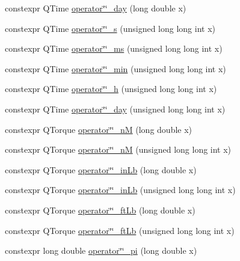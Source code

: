 \begin{DoxyCompactItemize}
\item 
constexpr Q\+Time \mbox{\hyperlink{namespaceokapi_1_1literals_a399e9f29b15b5e34ea3577f011a3ca28}{operator\char`\"{}\char`\"{}\+\_\+day}} (long double x)
\item 
constexpr Q\+Time \mbox{\hyperlink{namespaceokapi_1_1literals_a52e2803db21d89b8f608c32ad57a1d1d}{operator\char`\"{}\char`\"{}\+\_\+s}} (unsigned long long int x)
\item 
constexpr Q\+Time \mbox{\hyperlink{namespaceokapi_1_1literals_a3051bde71591186f767c4f1000044b5e}{operator\char`\"{}\char`\"{}\+\_\+ms}} (unsigned long long int x)
\item 
constexpr Q\+Time \mbox{\hyperlink{namespaceokapi_1_1literals_ae9718c12341692e929cde7bedcc55e4a}{operator\char`\"{}\char`\"{}\+\_\+min}} (unsigned long long int x)
\item 
constexpr Q\+Time \mbox{\hyperlink{namespaceokapi_1_1literals_a0d7788ca50c37d059b79a6d8363ea0f9}{operator\char`\"{}\char`\"{}\+\_\+h}} (unsigned long long int x)
\item 
constexpr Q\+Time \mbox{\hyperlink{namespaceokapi_1_1literals_a323a83894d9b82367a9a5e4ed103bb42}{operator\char`\"{}\char`\"{}\+\_\+day}} (unsigned long long int x)
\item 
constexpr Q\+Torque \mbox{\hyperlink{namespaceokapi_1_1literals_ac65b950fcec6f63f51fb8aa139cd43ec}{operator\char`\"{}\char`\"{}\+\_\+nM}} (long double x)
\item 
constexpr Q\+Torque \mbox{\hyperlink{namespaceokapi_1_1literals_a433bada2f177e78607acb15e2953668c}{operator\char`\"{}\char`\"{}\+\_\+nM}} (unsigned long long int x)
\item 
constexpr Q\+Torque \mbox{\hyperlink{namespaceokapi_1_1literals_aaa3c99e6571a76cd4088d2d55afd357d}{operator\char`\"{}\char`\"{}\+\_\+in\+Lb}} (long double x)
\item 
constexpr Q\+Torque \mbox{\hyperlink{namespaceokapi_1_1literals_a7bb3fd8e274b246c16fb5d7189e280dc}{operator\char`\"{}\char`\"{}\+\_\+in\+Lb}} (unsigned long long int x)
\item 
constexpr Q\+Torque \mbox{\hyperlink{namespaceokapi_1_1literals_ae51975f311fd3f3cc34443344f430dec}{operator\char`\"{}\char`\"{}\+\_\+ft\+Lb}} (long double x)
\item 
constexpr Q\+Torque \mbox{\hyperlink{namespaceokapi_1_1literals_a0bb5a987b1cc3e5f511cc5db14d29f8d}{operator\char`\"{}\char`\"{}\+\_\+ft\+Lb}} (unsigned long long int x)
\item 
constexpr long double \mbox{\hyperlink{namespaceokapi_1_1literals_a40698358b7eaa4c223ff8b0076249f4e}{operator\char`\"{}\char`\"{}\+\_\+pi}} (long double x)

\end{DoxyCompactItemize}
